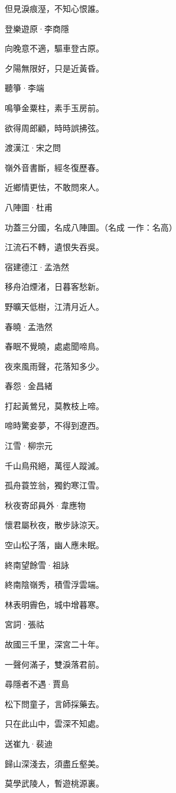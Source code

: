 \documentclass[12pt,a4paper]{ctexbook}
\begin{document}
但見淚痕溼，不知心恨誰。\par
登樂遊原·李商隱\par
向晚意不適，驅車登古原。\par
夕陽無限好，只是近黃昏。\par
聽箏·李端\par
鳴箏金粟柱，素手玉房前。\par
欲得周郎顧，時時誤拂弦。\par
渡漢江·宋之問\par
嶺外音書斷，經冬復歷春。\par
近鄉情更怯，不敢問來人。\par
八陣圖·杜甫\par
功蓋三分國，名成八陣圖。（名成 一作：名高）\par
江流石不轉，遺恨失吞吳。\par
宿建德江·孟浩然\par
移舟泊煙渚，日暮客愁新。\par
野曠天低樹，江清月近人。\par
春曉·孟浩然\par
春眠不覺曉，處處聞啼鳥。\par
夜來風雨聲，花落知多少。\par
春怨·金昌緒\par
打起黃鶯兒，莫教枝上啼。\par
啼時驚妾夢，不得到遼西。\par
江雪·柳宗元\par
千山鳥飛絕，萬徑人蹤滅。\par
孤舟蓑笠翁，獨釣寒江雪。\par
秋夜寄邱員外·韋應物\par
懷君屬秋夜，散步詠涼天。\par
空山松子落，幽人應未眠。\par
終南望餘雪·祖詠\par
終南陰嶺秀，積雪浮雲端。\par
林表明霽色，城中增暮寒。\par
宮詞·張祜\par
故國三千里，深宮二十年。\par
一聲何滿子，雙淚落君前。\par
尋隱者不遇·賈島\par
松下問童子，言師採藥去。\par
只在此山中，雲深不知處。\par
送崔九·裴迪\par
歸山深淺去，須盡丘壑美。\par
莫學武陵人，暫遊桃源裏。\par
\end{document}
